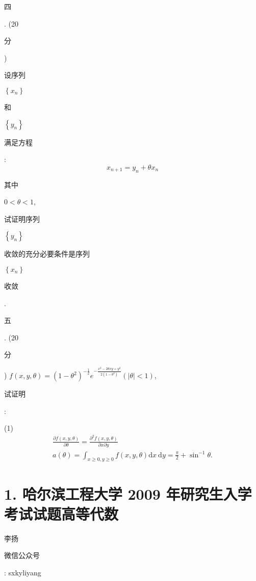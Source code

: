 \documentclass[10pt]{article}
\begin{document}
\begin{CJK}{UTF8}{mj}四\end{CJK}. (20 \begin{CJK}{UTF8}{mj}分\end{CJK}) \begin{CJK}{UTF8}{mj}设序列\end{CJK} $\left\{x_{n}\right\}$ \begin{CJK}{UTF8}{mj}和\end{CJK} $\left\{y_{n}\right\}$ \begin{CJK}{UTF8}{mj}满足方程\end{CJK}:
$$
x_{n+1}=y_{n}+\theta x_{n}
$$
\begin{CJK}{UTF8}{mj}其中\end{CJK} $0<\theta<1$, \begin{CJK}{UTF8}{mj}试证明序列\end{CJK} $\left\{y_{n}\right\}$ \begin{CJK}{UTF8}{mj}收敛的充分必要条件是序列\end{CJK} $\left\{x_{n}\right\}$ \begin{CJK}{UTF8}{mj}收敛\end{CJK}. \begin{CJK}{UTF8}{mj}五\end{CJK}. (20 \begin{CJK}{UTF8}{mj}分\end{CJK}) $f(x, y, \theta)=\left(1-\theta^{2}\right)^{-\frac{1}{2}} e^{-\frac{x^{2}-2 \theta x y+y^{2}}{2\left(1-\theta^{2}\right)}}(|\theta|<1)$, \begin{CJK}{UTF8}{mj}试证明\end{CJK}:

(1)
$$
\begin{gathered}
\frac{\partial f(x, y, \theta)}{\partial \theta}=\frac{\partial^{2} f(x, y, \theta)}{\partial x \partial y} \\
a(\theta)=\int_{x \geqslant 0, y \geqslant 0} f(x, y, \theta) \mathrm{d} x \mathrm{~d} y=\frac{\pi}{2}+\sin ^{-1} \theta .
\end{gathered}
$$

\section{1. 哈尔滨工程大学 2009 年研究生入学考试试题高等代数}
\begin{CJK}{UTF8}{mj}李扬\end{CJK}

\begin{CJK}{UTF8}{mj}微信公众号\end{CJK}: sxkyliyang
\end{document}
